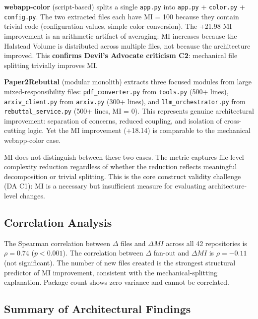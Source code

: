 \textbf{webapp-color} (script-based) splits a single \texttt{app.py} into \texttt{app.py} + \texttt{color.py} + \texttt{config.py}. The two extracted files each have MI = 100 because they contain trivial code (configuration values, simple color conversion). The +21.98 MI improvement is an arithmetic artifact of averaging: MI increases because the Halstead Volume is distributed across multiple files, not because the architecture improved. This \textbf{confirms Devil's Advocate criticism C2}: mechanical file splitting trivially improves MI.

\textbf{Paper2Rebuttal} (modular monolith) extracts three focused modules from large mixed-responsibility files: \texttt{pdf\_converter.py} from \texttt{tools.py} (500+ lines), \texttt{arxiv\_client.py} from \texttt{arxiv.py} (300+ lines), and \texttt{llm\_orchestrator.py} from \texttt{rebuttal\_service.py} (500+ lines, MI = 0). This represents genuine architectural improvement: separation of concerns, reduced coupling, and isolation of cross-cutting logic. Yet the MI improvement (+18.14) is comparable to the mechanical webapp-color case.

MI does not distinguish between these two cases. The metric captures file-level complexity reduction regardless of whether the reduction reflects meaningful decomposition or trivial splitting. This is the core construct validity challenge (DA C1): MI is a necessary but insufficient measure for evaluating architecture-level changes.

\subsection{Correlation Analysis}

The Spearman correlation between $\Delta$ files and $\Delta MI$ across all 42 repositories is $\rho = 0.74$ ($p < 0.001$). The correlation between $\Delta$ fan-out and $\Delta MI$ is $\rho = -0.11$ (not significant). The number of new files created is the strongest structural predictor of MI improvement, consistent with the mechanical-splitting explanation. Package count shows zero variance and cannot be correlated.

\subsection{Summary of Architectural Findings}

